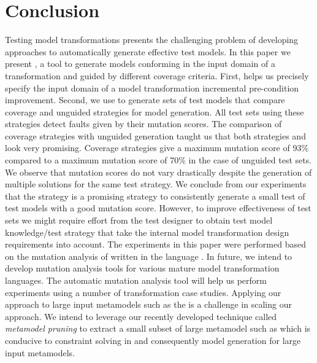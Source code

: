 \section{Conclusion}
\label{sec:Conclusion}

Testing model transformations  presents the challenging problem of developing approaches to automatically generate effective test models. In this paper we present {\Pramana}, a tool to generate models conforming in the input domain of a transformation and guided by different coverage criteria.  First, {\Pramana} helps us precisely specify the input domain of a model transformation incremental pre-condition improvement.  Second, we use {\Pramana} to generate sets of test models that compare coverage and unguided strategies for model generation. All test sets using these strategies detect faults given by their mutation scores.  The comparison of coverage strategies with unguided generation taught us that both strategies {\AllPartitions} and {\AllRanges} look very promising. Coverage strategies give a maximum mutation score of 93\% compared to a maximum mutation score of 70\% in the case of unguided test sets. We observe that mutation scores do not vary drastically despite the generation of multiple solutions for the same test strategy.  We conclude from our experiments that the {\AllPartitions} strategy is a promising strategy to consistently generate a small test of test models with a good mutation score. However, to improve effectiveness of test sets we might require effort from the test designer to obtain test model knowledge/test strategy that take the internal model transformation design requirements into account. The experiments in this paper were performed based on the mutation analysis of {\transfo} written in the language {\Kermeta}. In future, we intend to develop mutation analysis tools for various mature model transformation languages. The automatic mutation analysis tool will help us perform experiments using a number of transformation case studies. Applying our approach to large input metamodels such as the {\UML} is a challenge in scaling our approach. We intend to leverage our recently developed technique called \emph{metamodel pruning} \cite{sen2009b} to extract a small subset of large metamodel such as {\UML} which is conducive to constraint solving in {\Pramana} and consequently model generation for large input metamodels. 

